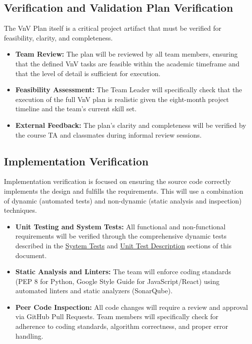 \documentclass[12pt, titlepage]{article}
\begin{document}
\subsection{Verification and Validation Plan Verification}



The VnV Plan itself is a critical project artifact that must be verified for feasibility, clarity, and completeness.

\begin{itemize}
    \item \textbf{Team Review:} The plan will be reviewed by all team members, ensuring that the defined VnV tasks are feasible within the academic timeframe and that the level of detail is sufficient for execution.
    \item \textbf{Feasibility Assessment:} The Team Leader will specifically check that the execution of the full VnV plan is realistic given the eight-month project timeline and the team’s current skill set.
    \item \textbf{External Feedback:} The plan's clarity and completeness will be verified by the course TA and classmates during informal review sessions.
\end{itemize}


\subsection{Implementation Verification}


Implementation verification is focused on ensuring the source code correctly implements the design and fulfills the requirements.
This will use a combination of dynamic (automated tests) and non-dynamic (static analysis and inspection) techniques.

\begin{itemize}
    \item \textbf{Unit Testing and System Tests:} All functional and non-functional requirements will be verified through the comprehensive dynamic tests described in the \hyperref[sec:srs-system]{System Tests} and \hyperref[sec:unit-test-description]{Unit Test Description} sections of this document.
    \item \textbf{Static Analysis and Linters:} The team will enforce coding standards (PEP 8 for Python, Google Style Guide for JavaScript/React) using automated linters and static analyzers (SonarQube).
    \item \textbf{Peer Code Inspection:} All code changes will require a review and approval via GitHub Pull Requests.
    Team members will specifically check for adherence to coding standards, algorithm correctness, and proper error handling.
\end{itemize}
\end{document}
